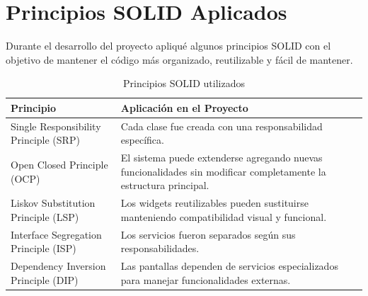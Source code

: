 \documentclass[12pt]{article}
\begin{document}

\section{Principios SOLID Aplicados}

Durante el desarrollo del proyecto apliqué algunos principios SOLID con el objetivo de mantener el código más organizado, reutilizable y fácil de mantener.

\begin{table}[H]
\centering
\begin{tabular}{|p{4cm}|p{9cm}|}
\hline

\textbf{Principio} & \textbf{Aplicación en el Proyecto} \\

\hline

Single Responsibility Principle (SRP)
&
Cada clase fue creada con una responsabilidad específica. \\

\hline

Open Closed Principle (OCP)
&
El sistema puede extenderse agregando nuevas funcionalidades sin modificar completamente la estructura principal. \\

\hline

Liskov Substitution Principle (LSP)
&
Los widgets reutilizables pueden sustituirse manteniendo compatibilidad visual y funcional. \\

\hline

Interface Segregation Principle (ISP)
&
Los servicios fueron separados según sus responsabilidades. \\

\hline

Dependency Inversion Principle (DIP)
&
Las pantallas dependen de servicios especializados para manejar funcionalidades externas. \\

\hline

\end{tabular}

\caption{Principios SOLID utilizados}
\end{table}

\end{document}
